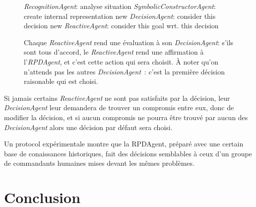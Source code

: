 \documentclass{article}
\begin{document}
\begin{figure}[H]
\begin{minipage}[H]{0.55\linewidth}
\begin{algorithmic}[1]
\STATE \emph{RecognitionAgent}: analyse situation
\STATE \emph{SymbolicConstructorAgent}: create internal representation
\STATE new \emph{DecisionAgent}: consider this decision
\STATE new \emph{ReactiveAgent}: consider this goal wrt. this decision
\ENDFOR
\ENDFOR
\end{algorithmic}
Chaque \emph{ReactiveAgent} rend une évaluation à son \emph{DecisionAgent}: s'ils sont tous d'accord, le \emph{ReactiveAgent} rend une affirmation à l'\emph{RPDAgent}, et c'est cette action qui sera choisit. À noter qu'on n'attends pas les autres \emph{DecisionAgent}~: c'est la première décision raisonable qui est choisi.
\end{minipage}
\end{figure}
\cite{sokolowski2003}
Si jamais certains \emph{ReactiveAgent} ne sont pas satisfaits par la décision, leur \emph{DecisionAgent} leur demandera de trouver un compromis entre eux, donc de modifier la décision, et si aucun compromis ne pourra être trouvé par aucun des \emph{DecisionAgent} alors une décision par défaut sera choisi.

Un protocol expérimentale montre que la RPDAgent, préparé avec une certain base de conaissances historiques, fait des décisions semblables à ceux d'un groupe de commandants humaines mises devant les mêmes problèmes. 


\section{Conclusion}


\newpage


\end{document}
